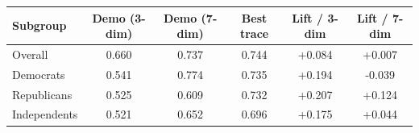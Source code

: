 \begin{tabular}{lccccc}
\toprule
Subgroup & Demo (3-dim) & Demo (7-dim) & Best trace & Lift / 3-dim & Lift / 7-dim \\
\midrule
Overall & 0.660 & 0.737 & 0.744 & +0.084 & +0.007 \\
Democrats & 0.541 & 0.774 & 0.735 & +0.194 & -0.039 \\
Republicans & 0.525 & 0.609 & 0.732 & +0.207 & +0.124 \\
Independents & 0.521 & 0.652 & 0.696 & +0.175 & +0.044 \\
\bottomrule
\end{tabular}